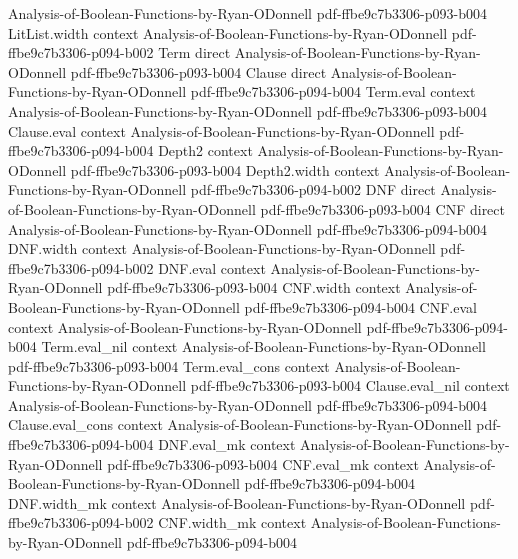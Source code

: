 \begin{lemma}
  {Analysis-of-Boolean-Functions-by-Ryan-ODonnell}
  {pdf-ffbe9c7b3306-p093-b004}
\proofstep
  {LitList.width}
  {context}
  {Analysis-of-Boolean-Functions-by-Ryan-ODonnell}
  {pdf-ffbe9c7b3306-p094-b002}
\proofstep
  {Term}
  {direct}
  {Analysis-of-Boolean-Functions-by-Ryan-ODonnell}
  {pdf-ffbe9c7b3306-p093-b004}
\proofstep
  {Clause}
  {direct}
  {Analysis-of-Boolean-Functions-by-Ryan-ODonnell}
  {pdf-ffbe9c7b3306-p094-b004}
\proofstep
  {Term.eval}
  {context}
  {Analysis-of-Boolean-Functions-by-Ryan-ODonnell}
  {pdf-ffbe9c7b3306-p093-b004}
\proofstep
  {Clause.eval}
  {context}
  {Analysis-of-Boolean-Functions-by-Ryan-ODonnell}
  {pdf-ffbe9c7b3306-p094-b004}
\proofstep
  {Depth2}
  {context}
  {Analysis-of-Boolean-Functions-by-Ryan-ODonnell}
  {pdf-ffbe9c7b3306-p093-b004}
\proofstep
  {Depth2.width}
  {context}
  {Analysis-of-Boolean-Functions-by-Ryan-ODonnell}
  {pdf-ffbe9c7b3306-p094-b002}
\proofstep
  {DNF}
  {direct}
  {Analysis-of-Boolean-Functions-by-Ryan-ODonnell}
  {pdf-ffbe9c7b3306-p093-b004}
\proofstep
  {CNF}
  {direct}
  {Analysis-of-Boolean-Functions-by-Ryan-ODonnell}
  {pdf-ffbe9c7b3306-p094-b004}
\proofstep
  {DNF.width}
  {context}
  {Analysis-of-Boolean-Functions-by-Ryan-ODonnell}
  {pdf-ffbe9c7b3306-p094-b002}
\proofstep
  {DNF.eval}
  {context}
  {Analysis-of-Boolean-Functions-by-Ryan-ODonnell}
  {pdf-ffbe9c7b3306-p093-b004}
\proofstep
  {CNF.width}
  {context}
  {Analysis-of-Boolean-Functions-by-Ryan-ODonnell}
  {pdf-ffbe9c7b3306-p094-b004}
\proofstep
  {CNF.eval}
  {context}
  {Analysis-of-Boolean-Functions-by-Ryan-ODonnell}
  {pdf-ffbe9c7b3306-p094-b004}
\proofstep
  {Term.eval_nil}
  {context}
  {Analysis-of-Boolean-Functions-by-Ryan-ODonnell}
  {pdf-ffbe9c7b3306-p093-b004}
\proofstep
  {Term.eval_cons}
  {context}
  {Analysis-of-Boolean-Functions-by-Ryan-ODonnell}
  {pdf-ffbe9c7b3306-p093-b004}
\proofstep
  {Clause.eval_nil}
  {context}
  {Analysis-of-Boolean-Functions-by-Ryan-ODonnell}
  {pdf-ffbe9c7b3306-p094-b004}
\proofstep
  {Clause.eval_cons}
  {context}
  {Analysis-of-Boolean-Functions-by-Ryan-ODonnell}
  {pdf-ffbe9c7b3306-p094-b004}
\proofstep
  {DNF.eval_mk}
  {context}
  {Analysis-of-Boolean-Functions-by-Ryan-ODonnell}
  {pdf-ffbe9c7b3306-p093-b004}
\proofstep
  {CNF.eval_mk}
  {context}
  {Analysis-of-Boolean-Functions-by-Ryan-ODonnell}
  {pdf-ffbe9c7b3306-p094-b004}
\proofstep
  {DNF.width_mk}
  {context}
  {Analysis-of-Boolean-Functions-by-Ryan-ODonnell}
  {pdf-ffbe9c7b3306-p094-b002}
\proofstep
  {CNF.width_mk}
  {context}
  {Analysis-of-Boolean-Functions-by-Ryan-ODonnell}
  {pdf-ffbe9c7b3306-p094-b004}
\proofstep

\end{lemma}
